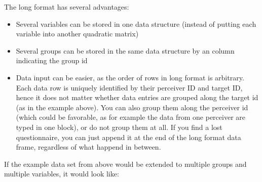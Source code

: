 \documentclass[a4paper]{article}\usepackage[]{graphicx}\usepackage[]{color}
\begin{document}
The long format has several advantages:
\begin{itemize}

	\item Several variables can be stored in one data structure (instead of putting each variable into another quadratic matrix)

	\item Several groups can be stored in the same data structure by an column indicating the group id
	
	\item Data input can be easier, as the order of rows in long format is arbitrary. Each data row is uniquely identified by their perceiver ID and target ID, hence it does not matter whether data entries are grouped along the target id (as in the example above). You can also group them along the perceiver id (which could be favorable, as for example the data from one perceiver are typed in one block), or do not group them at all. If you find a lost questionnaire, you can just append it at the end of the long format data frame, regardless of what happend in between.
\end{itemize}


If the example data set from above would be extended to multiple groups and multiple variables, it would look like:
\end{document}
